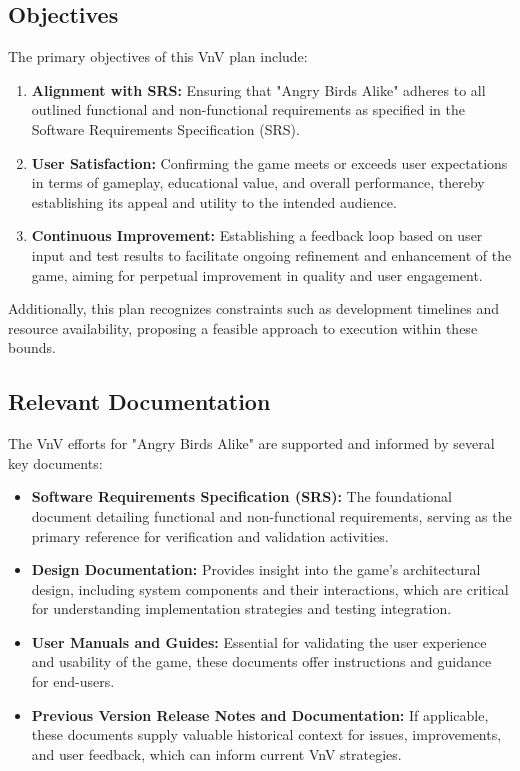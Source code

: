 \documentclass[12pt]{article}
\begin{document}
\subsection{Objectives}
The primary objectives of this VnV plan include:
\begin{enumerate}
    \item \textbf{Alignment with SRS:} Ensuring that "Angry Birds Alike" adheres to all outlined functional and non-functional requirements as specified in the Software Requirements Specification (SRS).
    \item \textbf{User Satisfaction:} Confirming the game meets or exceeds user expectations in terms of gameplay, educational value, and overall performance, thereby establishing its appeal and utility to the intended audience.
    \item \textbf{Continuous Improvement:} Establishing a feedback loop based on user input and test results to facilitate ongoing refinement and enhancement of the game, aiming for perpetual improvement in quality and user engagement.
\end{enumerate}
Additionally, this plan recognizes constraints such as development timelines and resource availability, proposing a feasible approach to execution within these bounds.

\subsection{Relevant Documentation}
The VnV efforts for "Angry Birds Alike" are supported and informed by several key documents:
\begin{itemize}
    \item \textbf{Software Requirements Specification (SRS):} The foundational document detailing functional and non-functional requirements, serving as the primary reference for verification and validation activities.
    \item \textbf{Design Documentation:} Provides insight into the game's architectural design, including system components and their interactions, which are critical for understanding implementation strategies and testing integration.
    \item \textbf{User Manuals and Guides:} Essential for validating the user experience and usability of the game, these documents offer instructions and guidance for end-users.
    \item \textbf{Previous Version Release Notes and Documentation:} If applicable, these documents supply valuable historical context for issues, improvements, and user feedback, which can inform current VnV strategies.
\end{itemize}
\end{document}
